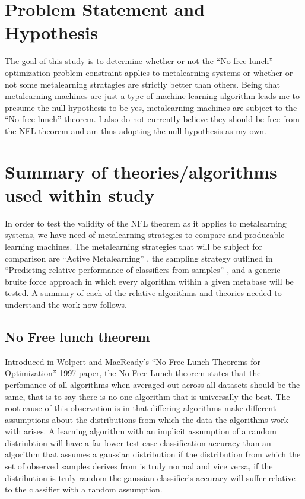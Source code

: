 \documentclass[a4paper,11pt]{article}
\begin{document}
\section{Problem Statement and Hypothesis}
  The goal of this study is to determine whether or not the ``No free lunch'' optimization problem
  constraint applies to metalearning systems or whether or not some metalearning stratagies are strictly
  better than others. Being that metalearning machines are just a type of machine learning algorithm
  leads me to presume the null hypothesis to be yes, metalearning machines are subject to the
  ``No free lunch'' theorem. I also do not currently believe they should be free from the NFL theorem
  and am thus adopting the null hypothesis as my own.

  \section{Summary of theories/algorithms used within study}

  In order to test the validity of the NFL theorem as it applies to metalearning systems,
  we have need of metalearning strategies to compare and producable learning machines.
  The metalearning strategies that will be subject for comparison are ``Active Metalearning'' \cite{Bhatt},
  the sampling strategy outlined in ``Predicting relative performance of classifiers from samples'' \cite{Leite},
  and a generic bruite force approach in which every algorithm within a given metabase will be tested. A
  summary of each of the relative algorithms and theories needed to understand the work now follows.

\subsection{No Free lunch theorem}
Introduced in Wolpert and MacReady's ``No Free Lunch Theorems for Optimization'' 1997 paper,
the No Free Lunch theorem states that the perfomance of all algorithms when averaged out across all
  datasets should be the same, that is to say there is no one algorithm that is universally the best.
  The root cause of this observation is in that differing algorithms make different assumptions about the
  distributions from which the data the algorithms work with arises. A learning algorithm with an implicit
  assumption of a random distriubtion will have a far lower test case classification accuracy than an
  algorithm that assumes a gaussian distribution if the distribution from which the set of observed
  samples derives from is truly normal and vice versa, if the distribution is truly random the gaussian
  classifier's accuracy will suffer relative to the classifier with a random assumption.
\end{document}
